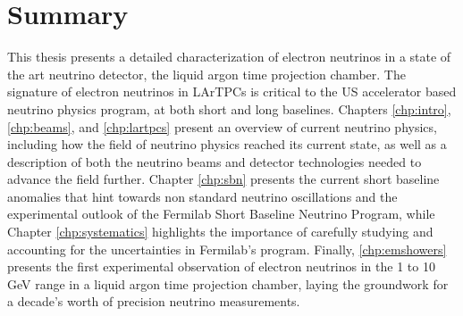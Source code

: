 \chapter{Summary}

This thesis presents a detailed characterization of electron neutrinos in a state of the art neutrino detector, the liquid argon time projection chamber.  The signature of electron neutrinos in LArTPCs is critical to the US accelerator based neutrino physics program, at both short and long baselines.  Chapters \ref{chp:intro}, \ref{chp:beams}, and \ref{chp:lartpcs} present an overview of current neutrino physics, including how the field of neutrino physics reached its current state, as well as a description of both the neutrino beams and detector technologies needed to advance the field further.  Chapter \ref{chp:sbn} presents the current short baseline anomalies that hint towards non standard neutrino oscillations and the experimental outlook of the Fermilab Short Baseline Neutrino Program, while Chapter \ref{chp:systematics} highlights the importance of carefully studying and accounting for the uncertainties in Fermilab's program.  Finally, \ref{chp:emshowers} presents the first experimental observation of electron neutrinos in the 1 to 10 GeV range in a liquid argon time projection chamber, laying the groundwork for a decade's worth of precision neutrino measurements.